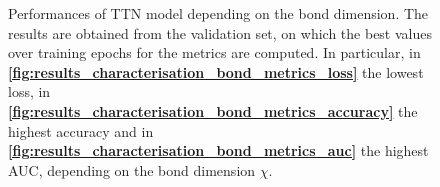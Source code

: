 \documentclass[xcolor=table,8pt]{beamer}
\begin{document}
\begin{frame}[t]
        \vspace{-7.5pt}
        \begin{figure}[!h]
            \begin{minipage}[c]{0.333\linewidth}
                \vspace{0pt}
                \centering
            \end{minipage}%
            \begin{minipage}[c]{0.333\linewidth}
                \vspace{0pt}
                \centering
            \end{minipage}%
            \begin{minipage}[c]{0.333\linewidth}
                \vspace{0pt}
                \centering
            \end{minipage}%
            \vspace{-2pt}
            \caption{Performances of TTN model depending on the bond dimension. The results are obtained from the validation set, on which the best values over training epochs for the metrics are computed. In particular, in \textbf{\ref{fig:results_characterisation_bond_metrics_loss}} the lowest loss, in \textbf{\ref{fig:results_characterisation_bond_metrics_accuracy}} the highest accuracy and in \textbf{\ref{fig:results_characterisation_bond_metrics_auc}} the highest AUC, depending on the bond dimension \( \chi \).}
            \label{fig:results_characterisation_bond_metrics}
        \end{figure}
    \end{frame}
    
\end{document}
